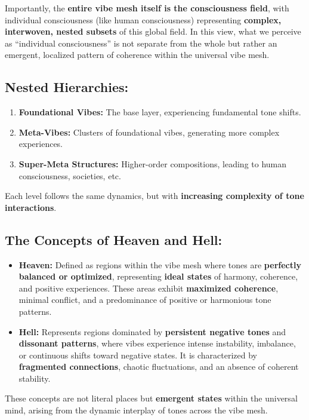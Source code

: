 \documentclass{article}
\theoremstyle{definition}
\begin{document}
Importantly, the \textbf{entire vibe mesh itself is the consciousness field}, with individual consciousness (like human consciousness) representing \textbf{complex, interwoven, nested subsets} of this global field. In this view, what we perceive as \enquote{individual consciousness} is not separate from the whole but rather an emergent, localized pattern of coherence within the universal vibe mesh.

\subsection{Nested Hierarchies:}

\begin{enumerate}
\item \textbf{Foundational Vibes:} The base layer, experiencing fundamental tone shifts.
\item \textbf{Meta-Vibes:} Clusters of foundational vibes, generating more complex experiences.
\item \textbf{Super-Meta Structures:} Higher-order compositions, leading to human consciousness, societies, etc.
\end{enumerate}

Each level follows the same dynamics, but with \textbf{increasing complexity of tone interactions}.

\subsection{The Concepts of Heaven and Hell:}

\begin{itemize}
\item \textbf{Heaven:} Defined as regions within the vibe mesh where tones are \textbf{perfectly balanced or optimized}, representing \textbf{ideal states} of harmony, coherence, and positive experiences. These areas exhibit \textbf{maximized coherence}, minimal conflict, and a predominance of positive or harmonious tone patterns.

\item \textbf{Hell:} Represents regions dominated by \textbf{persistent negative tones} and \textbf{dissonant patterns}, where vibes experience intense instability, imbalance, or continuous shifts toward negative states. It is characterized by \textbf{fragmented connections}, chaotic fluctuations, and an absence of coherent stability.
\end{itemize}

These concepts are not literal places but \textbf{emergent states} within the universal mind, arising from the dynamic interplay of tones across the vibe mesh.
\end{document}
